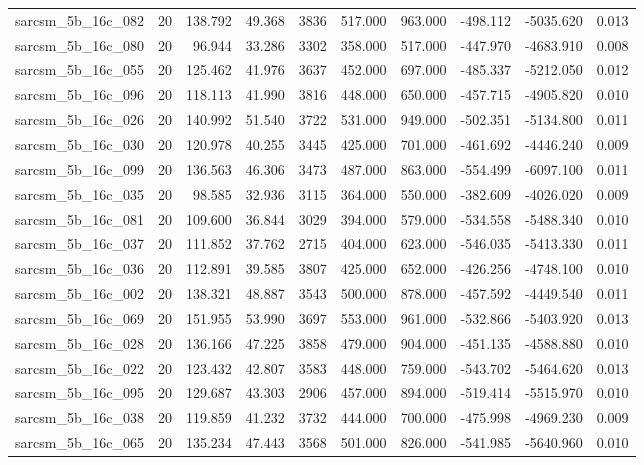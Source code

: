 \begin{tabular}{lrrrrrrrrr}
sarcsm\_5b\_16c\_082 & 20 & 138.792 & 49.368 & 3836 & 517.000 & 963.000 & -498.112 & -5035.620 & 0.013 \\
sarcsm\_5b\_16c\_080 & 20 & 96.944 & 33.286 & 3302 & 358.000 & 517.000 & -447.970 & -4683.910 & 0.008 \\
sarcsm\_5b\_16c\_055 & 20 & 125.462 & 41.976 & 3637 & 452.000 & 697.000 & -485.337 & -5212.050 & 0.012 \\
sarcsm\_5b\_16c\_096 & 20 & 118.113 & 41.990 & 3816 & 448.000 & 650.000 & -457.715 & -4905.820 & 0.010 \\
sarcsm\_5b\_16c\_026 & 20 & 140.992 & 51.540 & 3722 & 531.000 & 949.000 & -502.351 & -5134.800 & 0.011 \\
sarcsm\_5b\_16c\_030 & 20 & 120.978 & 40.255 & 3445 & 425.000 & 701.000 & -461.692 & -4446.240 & 0.009 \\
sarcsm\_5b\_16c\_099 & 20 & 136.563 & 46.306 & 3473 & 487.000 & 863.000 & -554.499 & -6097.100 & 0.011 \\
sarcsm\_5b\_16c\_035 & 20 & 98.585 & 32.936 & 3115 & 364.000 & 550.000 & -382.609 & -4026.020 & 0.009 \\
sarcsm\_5b\_16c\_081 & 20 & 109.600 & 36.844 & 3029 & 394.000 & 579.000 & -534.558 & -5488.340 & 0.010 \\
sarcsm\_5b\_16c\_037 & 20 & 111.852 & 37.762 & 2715 & 404.000 & 623.000 & -546.035 & -5413.330 & 0.011 \\
sarcsm\_5b\_16c\_036 & 20 & 112.891 & 39.585 & 3807 & 425.000 & 652.000 & -426.256 & -4748.100 & 0.010 \\
sarcsm\_5b\_16c\_002 & 20 & 138.321 & 48.887 & 3543 & 500.000 & 878.000 & -457.592 & -4449.540 & 0.011 \\
sarcsm\_5b\_16c\_069 & 20 & 151.955 & 53.990 & 3697 & 553.000 & 961.000 & -532.866 & -5403.920 & 0.013 \\
sarcsm\_5b\_16c\_028 & 20 & 136.166 & 47.225 & 3858 & 479.000 & 904.000 & -451.135 & -4588.880 & 0.010 \\
sarcsm\_5b\_16c\_022 & 20 & 123.432 & 42.807 & 3583 & 448.000 & 759.000 & -543.702 & -5464.620 & 0.013 \\
sarcsm\_5b\_16c\_095 & 20 & 129.687 & 43.303 & 2906 & 457.000 & 894.000 & -519.414 & -5515.970 & 0.010 \\
sarcsm\_5b\_16c\_038 & 20 & 119.859 & 41.232 & 3732 & 444.000 & 700.000 & -475.998 & -4969.230 & 0.009 \\
sarcsm\_5b\_16c\_065 & 20 & 135.234 & 47.443 & 3568 & 501.000 & 826.000 & -541.985 & -5640.960 & 0.010 \\

\end{tabular}
